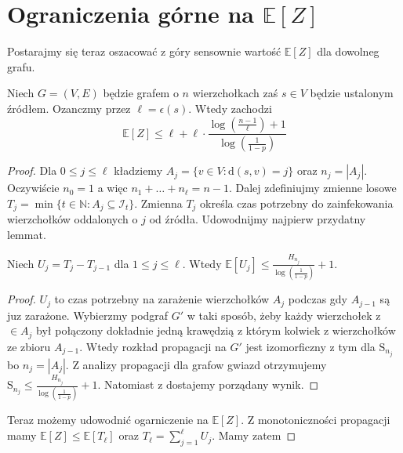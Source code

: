 \section{Ograniczenia górne na $\mathbb{E}[Z]$}
Postarajmy się teraz oszacować z góry sensownie wartość $\mathbb{E}[Z]$ dla dowolneg grafu.

\begin{theorem}\label{T:upper_bound_on_EZ}
Niech $G=(V,E)$ będzie grafem o $n$ wierzchołkach zaś $s\in V$ będzie ustalonym źródłem. Ozanczmy przez $\ell = \epsilon(s)$. Wtedy zachodzi
\[
    \mathbb{E}[Z] \le \ell  + \ell \cdot \frac{\log(\frac{n-1}{\ell}) + 1}{\log(\frac{1}{1-p})}
\]
\end{theorem}

\begin{proof}
Dla $0\le j \le \ell$ kładziemy $A_j = \{v \in V : \mathrm{d}(s,v) = j\}$ oraz $n_j= |A_j|$. Oczywiście $n_0=1$ a więc $n_1+\dots+ n_\ell = n -1 $. Dalej zdefiniujmy zmienne losowe $T_j = \min\{t\in\mathbb{N} : A_j \subseteq \mathcal{I}_t\}$. Zmienna $T_j$ określa czas potrzebny do zainfekowania wierzchołków oddalonych o $j$ od źródła. Udowodnijmy najpierw przydatny lemmat.

\begin{lemma}\label{L:helper_lemma}
Niech $U_j = T_j - T_{j-1}$ dla $1 \le j \le \ell$. Wtedy $\mathbb{E}[U_j] \le \frac{H_{n_j}}{\log(\frac{1}{1-p})} + 1$.
\end{lemma}
\begin{proof}
$U_j$ to czas potrzebny na zarażenie wierzchołków $A_j$ podczas gdy $A_{j-1}$ są juz zarażone. Wybierzmy podgraf $G'$ w taki sposób, żeby każdy wierzchołek z $\in A_j$ był połączony dokładnie jedną krawędzią z którym kolwiek z wierzchołków ze zbioru $A_{j-1}$. Wtedy rozkład propagacji na $G'$ jest izomorficzny z tym dla $\mathrm{S}_{n_j}$ bo $n_j=|A_j|$. Z analizy propagacji dla grafow gwiazd otrzymujemy $\mathrm{S}_{n_j} \le \frac{H_{n_j}}{\log(\frac{1}{1-p})} + 1$. Natomiast z  dostajemy porządany wynik.
\end{proof}

Teraz możemy udowodnić ogarniczenie na $\mathbb{E}[Z]$. Z monotoniczności propagacji mamy $\mathbb{E}[Z] \le \mathbb{E}[T_\ell]$ oraz $T_\ell = \sum_{j=1}^{\ell} U_j$. Mamy zatem


\end{proof}
